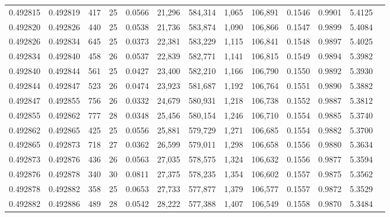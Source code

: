 \begin{tabular}{rrrrrrrrrrrrr}
0.492815 & 0.492819 & 417 &  25 &                                     0.0566 &  21,296 & 584,314 &   1,065 & 106,891 & 0.1546 & 0.9901 & 5.4125 \\
0.492820 & 0.492826 & 440 &  25 &                                     0.0538 &  21,736 & 583,874 &   1,090 & 106,866 & 0.1547 & 0.9899 & 5.4084 \\
0.492826 & 0.492834 & 645 &  25 &                                     0.0373 &  22,381 & 583,229 &   1,115 & 106,841 & 0.1548 & 0.9897 & 5.4025 \\
0.492834 & 0.492840 & 458 &  26 &                                     0.0537 &  22,839 & 582,771 &   1,141 & 106,815 & 0.1549 & 0.9894 & 5.3982 \\
0.492840 & 0.492844 & 561 &  25 &                                     0.0427 &  23,400 & 582,210 &   1,166 & 106,790 & 0.1550 & 0.9892 & 5.3930 \\
0.492844 & 0.492847 & 523 &  26 &                                     0.0474 &  23,923 & 581,687 &   1,192 & 106,764 & 0.1551 & 0.9890 & 5.3882 \\
0.492847 & 0.492855 & 756 &  26 &                                     0.0332 &  24,679 & 580,931 &   1,218 & 106,738 & 0.1552 & 0.9887 & 5.3812 \\
0.492855 & 0.492862 & 777 &  28 &                                     0.0348 &  25,456 & 580,154 &   1,246 & 106,710 & 0.1554 & 0.9885 & 5.3740 \\
0.492862 & 0.492865 & 425 &  25 &                                     0.0556 &  25,881 & 579,729 &   1,271 & 106,685 & 0.1554 & 0.9882 & 5.3700 \\
0.492865 & 0.492873 & 718 &  27 &                                     0.0362 &  26,599 & 579,011 &   1,298 & 106,658 & 0.1556 & 0.9880 & 5.3634 \\
0.492873 & 0.492876 & 436 &  26 &                                     0.0563 &  27,035 & 578,575 &   1,324 & 106,632 & 0.1556 & 0.9877 & 5.3594 \\
0.492876 & 0.492878 & 340 &  30 &                                     0.0811 &  27,375 & 578,235 &   1,354 & 106,602 & 0.1557 & 0.9875 & 5.3562 \\
0.492878 & 0.492882 & 358 &  25 &                                     0.0653 &  27,733 & 577,877 &   1,379 & 106,577 & 0.1557 & 0.9872 & 5.3529 \\
0.492882 & 0.492886 & 489 &  28 &                                     0.0542 &  28,222 & 577,388 &   1,407 & 106,549 & 0.1558 & 0.9870 & 5.3484 \\

\end{tabular}
